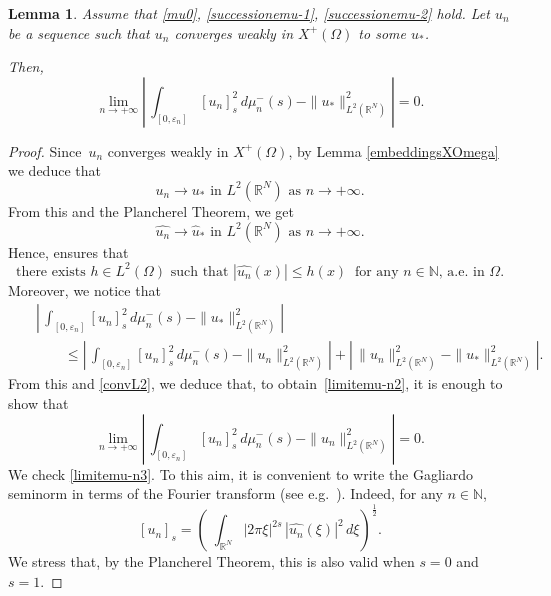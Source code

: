 \documentclass[12pt,a4paper,intlimits,sumlimits]{amsart}
\def \N {\mathbb{N}}
\def \R {\mathbb{R}}
\theoremstyle{definition}
\theoremstyle{plain}
\newtheorem{lemma}[definition]{Lemma}
\numberwithin{equation}{section}
\renewcommand{\le}{\leqslant}
\begin{document}
\begin{lemma}\label{lemma2}
Assume that \eqref{mu0}, \eqref{successionemu-1}, \eqref{successionemu-2} hold. Let $u_n$ be a sequence such that $u_n$ converges weakly in $X^+(\Omega)$ to some $u_*$.

Then,
\begin{equation}\label{limitemu-n2}
\lim_{n\to +\infty}\left|\,\int_{[0, \varepsilon_n]} [u_n]^2_s\, d\mu^-_n(s) - \|u_*\|^2_{L^2(\R^N)} \right| = 0.
\end{equation}
\end{lemma}
\begin{proof}
Since~$u_n$ converges weakly in $X^+(\Omega)$, by Lemma \ref{embeddingsXOmega} we deduce that
\begin{equation}\label{convL2}
{\mbox{$u_n\to u_*$ in~$L^2(\R^N)$ as $n\to +\infty $.}}
\end{equation}
From this and the Plancherel Theorem, we get
\begin{equation}\label{convL2trasformata}
{\mbox{$\widehat{u_n}\to \widehat{u}_*$ in $L^2(\R^N)$ as $n\to +\infty $.}}
\end{equation}
Hence,  \cite[Theorem 4.9]{MR2759829} ensures that
\begin{equation}\label{hinL2}
\mbox{there exists $h\in L^2(\Omega)$ such that } |\widehat{u_n}(x)|\le h(x) \ \mbox{ for any $n\in\N$, a.e. in $\Omega$}.
\end{equation}
Moreover, we notice that
\begin{eqnarray*}&&
\left|\,\int_{[0, \varepsilon_n]} [u_n]^2_s\, d\mu^-_n(s) - \|u_*\|^2_{L^2(\R^N)} \right|\\&&\qquad\le \left|\,\int_{[0, \varepsilon_n]} [u_n]^2_s\, d\mu^-_n(s) - \|u_n\|^2_{L^2(\R^N)} \right| + \left|\,\|u_n\|^2_{L^2(\R^N)} - \|u_*\|^2_{L^2(\R^N)} \right|.
\end{eqnarray*}
From this and \eqref{convL2},  we deduce that, to obtain~\eqref{limitemu-n2}, it is enough to show that
\begin{equation}\label{limitemu-n3}
\lim_{n\to +\infty}\left|\,\int_{[0, \varepsilon_n]} [u_n]^2_s\, d\mu^-_n(s) - \|u_n\|^2_{L^2(\R^N)} \right| = 0.
\end{equation}
We check \eqref{limitemu-n3}. To this aim, it is convenient to write the Gagliardo seminorm in terms of the Fourier transform (see e.g.~\cite{MR2944369}). Indeed, for any $n\in\N$,
\[
[u_n]_s=\left(\;\int_{\R^{N}} |2\pi \xi|^{2s}\,|\widehat{u_n}(\xi)|^2\,d\xi\right)^{\frac12}.
\]
We stress that, by the Plancherel Theorem, this is also valid when $s=0$ and $s=1$.


\end{proof}
\end{document}
